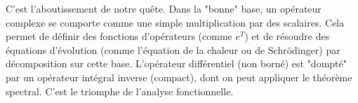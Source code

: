 \begin{remark}
    C'est l'aboutissement de notre quête. Dans la "bonne" base, un opérateur complexe se comporte comme une simple multiplication par des scalaires. Cela permet de définir des fonctions d'opérateurs (comme $e^T$) et de résoudre des équations d'évolution (comme l'équation de la chaleur ou de Schrödinger) par décomposition sur cette base. L'opérateur différentiel (non borné) est "dompté" par un opérateur intégral inverse (compact), dont on peut appliquer le théorème spectral. C'est le triomphe de l'analyse fonctionnelle.
\end{remark}
